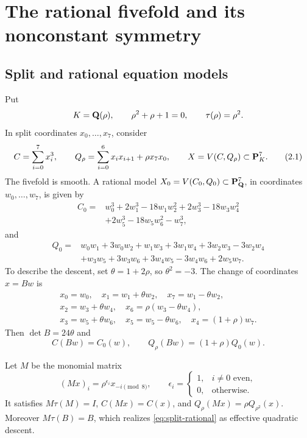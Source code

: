 \section{The rational fivefold and its nonconstant symmetry}
\label{sec:source}

\subsection{Split and rational equation models}

Put
\[
 K=\mathbf Q(\rho),\qquad \rho^2+\rho+1=0,\qquad
 \tau(\rho)=\rho^2.
\]
In split coordinates \(x_0,\ldots,x_7\), consider
\[
 C=\sum_{i=0}^7x_i^3,\qquad
 Q_\rho=\sum_{i=0}^6x_ix_{i+1}+\rho x_7x_0,\qquad
 X=V(C,Q_\rho)\subset\mathbf P^7_K.                       \tag{2.1}
\]
The fivefold is smooth.  A rational model
\(X_0=V(C_0,Q_0)\subset\mathbf P^7_\mathbf Q\), in coordinates
\(w_0,\ldots,w_7\), is given by
\[
\begin{aligned}
C_0={}&w_0^3+2w_1^3-18w_1w_2^2+2w_3^3-18w_3w_4^2\\
     &+2w_5^3-18w_5w_6^2-w_7^3,
\end{aligned}                                      \tag{2.2}
\]
and
\[
\begin{aligned}
Q_0={}&w_0w_1+3w_0w_2+w_1w_3+3w_1w_4
       +3w_2w_3-3w_2w_4\\
     &+w_3w_5+3w_3w_6+3w_4w_5-3w_4w_6+2w_5w_7.
\end{aligned}                                      \tag{2.3}
\]
To describe the descent, set \(\theta=1+2\rho\), so \(\theta^2=-3\).
The change of coordinates \(x=Bw\) is
\[
\begin{gathered}
x_0=w_0,\quad x_1=w_1+\theta w_2,\quad
x_7=w_1-\theta w_2,\\
x_2=w_3+\theta w_4,\quad
x_6=\rho(w_3-\theta w_4),\\
x_3=w_5+\theta w_6,\quad
x_5=w_5-\theta w_6,\quad
x_4=(1+\rho)w_7.
\end{gathered}                                      \tag{2.4}
\]
Then \(\det B=24\theta\) and
\[
 C(Bw)=C_0(w),\qquad Q_\rho(Bw)=(1+\rho)Q_0(w).
\tag{2.5}
\label{eq:split-rational}
\]

Let \(M\) be the monomial matrix
\[
 (Mx)_i=\rho^{\epsilon_i}x_{-i\!\!\pmod 8},\qquad
 \epsilon_i=
 \begin{cases}
 1,&i\ne0\text{ even},\\
 0,&\text{otherwise}.
 \end{cases}                                       \tag{2.6}
\]
It satisfies \(M\tau(M)=I\), \(C(Mx)=C(x)\), and
\(Q_\rho(Mx)=\rho Q_{\rho^2}(x)\).  Moreover
\(M\tau(B)=B\), which realizes \cref{eq:split-rational} as effective
quadratic descent.

